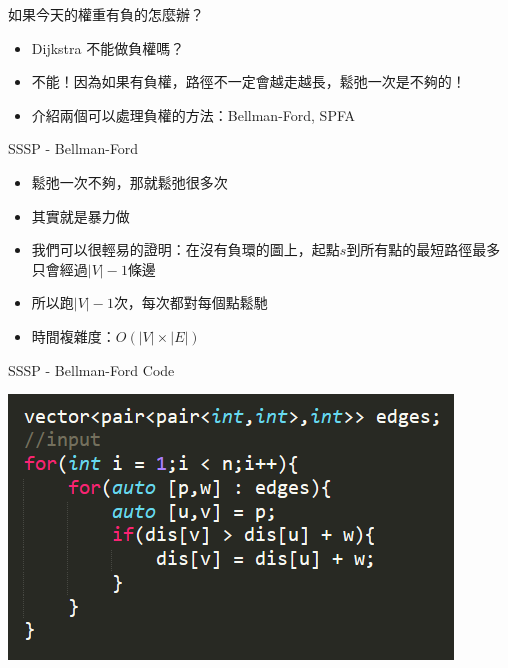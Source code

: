 \documentclass[aspectratio=169]{beamer}
\begin{document}
    \begin{frame}{如果今天的權重有負的怎麼辦？}
        \begin{itemize}
            \item Dijkstra 不能做負權嗎？
            \item<2-> 不能！因為如果有負權，路徑不一定會越走越長，鬆弛一次是不夠的！
            \item<3-> 介紹兩個可以處理負權的方法：Bellman-Ford, SPFA
        \end{itemize}
    \end{frame}
    \begin{frame}{SSSP - Bellman-Ford}
        \begin{itemize}
            \item 鬆弛一次不夠，那就鬆弛很多次
            \item<2-> 其實就是暴力做
            \item<2-> 我們可以很輕易的證明：在沒有負環的圖上，起點$s$到所有點的最短路徑最多只會經過$|V|-1$條邊
            \item<2-> 所以跑$|V|-1$次，每次都對每個點鬆馳
            \item<3-> 時間複雜度：$O(|V|\times |E|)$
        \end{itemize}
    \end{frame}
    \begin{frame}{SSSP - Bellman-Ford Code}
        \begin{center}
             \includegraphics[scale=0.7]{code/BellmanFord_code.png}
        \end{center}
    \end{frame}
\end{document}
